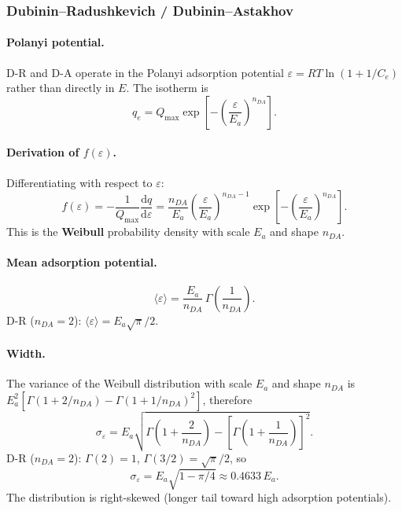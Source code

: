 \documentclass[journal=aamick,manuscript=article]{achemso}
\begin{document}
\subsubsection{Dubinin--Radushkevich / Dubinin--Astakhov}

\paragraph{Polanyi potential.}
D-R and D-A operate in the Polanyi adsorption potential
$\varepsilon = RT\ln(1 + 1/C_e)$ rather than directly in $E$.
The isotherm is
\begin{equation}
	q_e = Q_{\max}\exp\!\left[-\!\left(\frac{\varepsilon}{E_a}\right)^{\!n_{DA}}\right].
\end{equation}

\paragraph{Derivation of $f(\varepsilon)$.}
Differentiating with respect to $\varepsilon$:
\begin{equation}
	f(\varepsilon) = -\frac{1}{Q_{\max}}\frac{\mathrm{d}q}{\mathrm{d}\varepsilon}
	= \frac{n_{DA}}{E_a}\left(\frac{\varepsilon}{E_a}\right)^{n_{DA}-1}
	\exp\!\left[-\!\left(\frac{\varepsilon}{E_a}\right)^{n_{DA}}\right].
	\label{eq:si_fE_DA}
\end{equation}
This is the \textbf{Weibull} probability density with scale $E_a$
and shape $n_{DA}$.

\paragraph{Mean adsorption potential.}
\begin{equation}
	\langle\varepsilon\rangle
	= \frac{E_a}{n_{DA}}\,\Gamma\!\left(\frac{1}{n_{DA}}\right).
\end{equation}
D-R ($n_{DA}=2$): $\langle\varepsilon\rangle = E_a\sqrt{\pi}/2$.

\paragraph{Width.}
The variance of the Weibull distribution with scale $E_a$ and shape $n_{DA}$ is
$E_a^2[\Gamma(1+2/n_{DA})-\Gamma(1+1/n_{DA})^2]$, therefore
\begin{equation}
	\sigma_\varepsilon
	= E_a\sqrt{\Gamma\!\left(1+\frac{2}{n_{DA}}\right)
	           - \left[\Gamma\!\left(1+\frac{1}{n_{DA}}\right)\right]^{2}}.
	\label{eq:si_sigmaE_DA}
\end{equation}
D-R ($n_{DA}=2$): $\Gamma(2)=1$, $\Gamma(3/2)=\sqrt{\pi}/2$, so
\begin{equation}
	\sigma_\varepsilon = E_a\sqrt{1-\pi/4} \approx 0.4633\,E_a.
\end{equation}
The distribution is right-skewed (longer tail toward high adsorption potentials).
\end{document}
